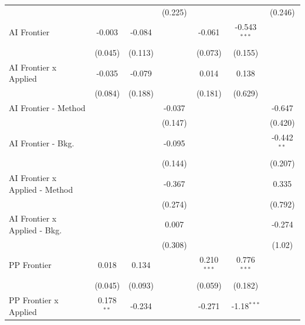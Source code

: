 \begin{tabular}{lcccccc}
                                  &               &               & (0.225)       &               &                & (0.246)\\   
   AI Frontier                    & -0.003        & -0.084        &               & -0.061        & -0.543$^{***}$ &   \\   
                                  & (0.045)       & (0.113)       &               & (0.073)       & (0.155)        &   \\   
   AI Frontier x Applied          & -0.035        & -0.079        &               & 0.014         & 0.138          &   \\   
                                  & (0.084)       & (0.188)       &               & (0.181)       & (0.629)        &   \\   
   AI Frontier - Method           &               &               & -0.037        &               &                & -0.647\\   
                                  &               &               & (0.147)       &               &                & (0.420)\\   
   AI Frontier - Bkg.             &               &               & -0.095        &               &                & -0.442$^{**}$\\   
                                  &               &               & (0.144)       &               &                & (0.207)\\   
   AI Frontier x Applied - Method &               &               & -0.367        &               &                & 0.335\\   
                                  &               &               & (0.274)       &               &                & (0.792)\\   
   AI Frontier x Applied - Bkg.   &               &               & 0.007         &               &                & -0.274\\   
                                  &               &               & (0.308)       &               &                & (1.02)\\   
   PP Frontier                    & 0.018         & 0.134         &               & 0.210$^{***}$ & 0.776$^{***}$  &   \\   
                                  & (0.045)       & (0.093)       &               & (0.059)       & (0.182)        &   \\   
   PP Frontier x Applied          & 0.178$^{**}$  & -0.234        &               & -0.271        & -1.18$^{***}$  &   \\   

\end{tabular}
